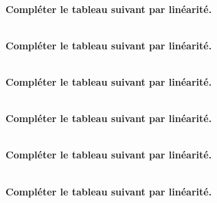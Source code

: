 \exercice \diff[1] \\
\textbf{Compléter le tableau suivant par linéarité.}

\newpage%
\exercice \diff[2]  \\
\textbf{Compléter le tableau suivant par linéarité.}

\exercice \diff[2] \\
\textbf{Compléter le tableau suivant par linéarité.}

\exercice \diff[2] \\
\textbf{Compléter le tableau suivant par linéarité.}


\exercice \diff[2] \\
\textbf{Compléter le tableau suivant par linéarité.}

\exercice \diff[2] \\
\textbf{Compléter le tableau suivant par linéarité.}




